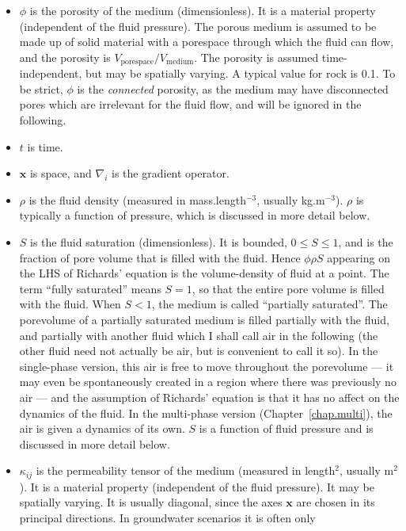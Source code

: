 \documentclass[]{scrreprt}
\begin{document}
\begin{itemize}
\item $\phi$ is the porosity of the medium (dimensionless).  It is a
  material property (independent of the fluid pressure).  The porous
  medium is assumed to be made up of solid material with a porespace
  through which the fluid can flow, and the porosity is
  $V_{\mathrm{porespace}}/V_{\mathrm{medium}}$.  The porosity is assumed
  time-independent, but may be spatially varying.  A typical value for
  rock is 0.1.  To be strict, $\phi$ is the {\em connected} porosity, as the
  medium may have disconnected pores which are irrelevant for the
  fluid flow, and will be ignored in the following.
\item $t$ is time.
\item ${\mathbf{x}}$ is space, and $\nabla_{i}$ is the gradient operator.
\item $\rho$ is the fluid density (measured in mass.length$^{-3}$,
  usually kg.m$^{-3}$).  $\rho$ is
  typically a function of pressure, which is discussed in more detail below.
\item $S$ is the fluid saturation (dimensionless).  It is bounded,
  $0\leq S \leq 1$, and is the fraction of pore volume that is filled
  with the fluid.  Hence $\phi\rho S$ appearing on the LHS of
  Richards' equation is the volume-density of fluid at a point.  The term ``fully
  saturated'' means $S=1$, so that the entire pore volume is filled
  with the fluid.  When $S<1$, the medium is called ``partially
  saturated''.  The porevolume of a partially saturated medium is
  filled partially with the fluid, and partially with another fluid
  which I shall call air in the following (the other fluid need not
  actually be air, but is convenient to call it so).  In the
  single-phase version, this air is free
  to move throughout the porevolume --- it may even be spontaneously
  created in a region where there was previously no air --- and the
  assumption of Richards' equation is that it has no affect on the
  dynamics of the fluid.   In the multi-phase version
  (Chapter~\ref{chap.multi}), the air is given a dynamics of its own.
  $S$ is a function of fluid pressure and is discussed in more detail below.
\item $\kappa_{ij}$ is the permeability tensor of the medium (measured
  in length$^{2}$, usually m$^{2}$).  It is a material property
  (independent of the fluid pressure).  It may be spatially varying.
  It is usually diagonal, since the axes ${\mathbf{x}}$ are chosen in
  its principal directions.  In groundwater scenarios it is often only

\end{itemize}
\end{document}
